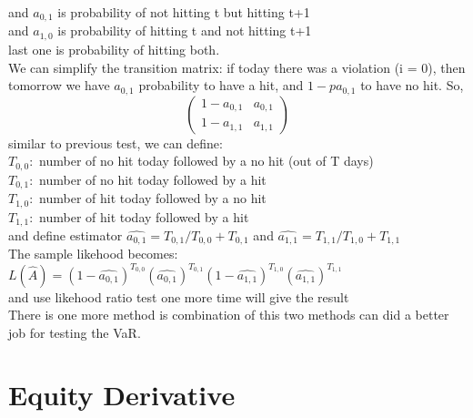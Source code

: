 \documentclass[a4paper,11pt]{article}
\begin{document}
and $a_{0,1}$ is probability of not hitting t but hitting t+1\\
and $a_{1,0}$ is probability of hitting t and not hitting t+1\\
last one is probability of hitting both.\\
We can simplify the transition matrix: if today there was a violation (i = 0), then tomorrow
we have $a_{0,1}$ probability to have a hit, and  $1-pa_{0,1}$  to have no hit. So,
$$
\begin{pmatrix}
1-a_{0,1} & a_{0,1} \\
1-a_{1,1} & a_{1,1}
\end{pmatrix}
$$
similar to previous test, we can define:\\
$T_{0,0}:$ number of no hit today followed by a no hit (out of T days)\\
$T_{0,1}:$ number of no hit today followed by a hit\\
$T_{1,0}:$ number of hit today followed by a no hit\\
$T_{1,1}:$ number of hit today followed by a hit\\
and define estimator $\hat{a_{0,1}}=T_{0,1}/T_{0,0}+T_{0,1}$ and $\hat{a_{1,1}}=T_{1,1}/T_{1,0}+T_{1,1}$\\
The sample likehood becomes:$L(\hat{A})=(1-\hat{a_{0,1}})^{T_{0,0}}(\hat{a_{0,1}})^{T_{0,1}}(1-\hat{a_{1,1}})^{T_{1,0}}(\hat{a_{1,1}})^{T_{1,1}}$\\
and use likehood ratio test one more time will give the result\\
There is one more method is combination of this two methods can did a better job for testing the VaR.
\section{Equity Derivative}
\end{document}
